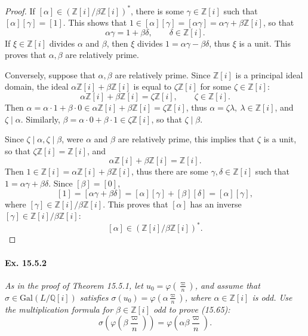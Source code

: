\documentclass[11pt,a4paper]{article}
\newcommand{\Q}{\mathbb{Q}}
\newcommand{\Z}{\mathbb{Z}}
\newcommand{\Gal}{\mathrm{Gal}}
\begin{document}
\begin{proof} 
If $[\alpha] \in \left(\Z[i]/ \beta \Z[i] \right)^*$, there is some $\gamma \in \Z[i]$ such that $[\alpha] [\gamma ] = [1]$. This shows that $1 \in [\alpha] [\gamma] = [\alpha \gamma] = \alpha \gamma+ \beta \Z[i]$, so that
$$\alpha \gamma = 1 + \beta \delta,\qquad \delta \in \Z[i].$$
If $\xi \in \Z[i]$ divides $\alpha$ and $\beta$, then $\xi$ divides $1 = \alpha \gamma - \beta \delta$, thus $\xi$ is a unit. This proves that $\alpha, \beta$ are relatively prime.

\bigskip

Conversely, suppose that $\alpha, \beta$ are relatively prime. Since $\Z[i]$ is a principal ideal domain, the ideal $\alpha \Z[i] + \beta \Z[i]$ is equal to $\zeta \Z[i]$ for some $\zeta \in \Z[i]$:
$$\alpha \Z[i] + \beta \Z[i] = \zeta \Z[i],\qquad \zeta \in \Z[i].$$
Then $\alpha = \alpha\cdot 1 + \beta \cdot 0 \in \alpha \Z[i] + \beta \Z[i] = \zeta \Z[i]$, thus $\alpha = \zeta \lambda,\ \lambda \in \Z[i]$, and $\zeta \mid \alpha$. Similarly, $\beta  = \alpha \cdot 0 + \beta \cdot 1 \in \zeta \Z[i]$, so that $ \zeta \mid \beta $. 

Since $\zeta \mid \alpha, \zeta \mid \beta$, were $\alpha$ and $\beta$ are relatively prime, this implies that $\zeta$ is a unit, so that $\zeta \Z[i] = \Z[i]$, and
$$\alpha \Z[i] + \beta \Z[i] = \Z[i].$$
Then $1 \in \Z[i] = \alpha \Z[i] + \beta \Z[i] $, thus there are some $\gamma, \delta \in \Z[i]$ such that $1 =\alpha \gamma + \beta \delta$. Since $[\beta] = [0]$,
$$[1] = [\alpha \gamma + \beta \delta] = [\alpha][\gamma] + [\beta][\delta] = [\alpha][\gamma],$$
where $[\gamma] \in \Z[i]/\beta \Z[i]$. This proves that $[\alpha]$ has an inverse $[\gamma] \in \Z[i]/\beta \Z[i]$:
$$[\alpha] \in \left(\Z[i]/ \beta \Z[i] \right)^*.$$
\end{proof}

\paragraph{Ex. 15.5.2}{\it As in the proof of Theorem 15.5.1, let $u_0 = \varphi \left(\frac{\varpi}{n} \right)$, and assume that $\sigma \in \Gal\left(L/\Q[i]\right)$ satisfies $\sigma(u_0) = \varphi\left(\alpha 
\frac{\varpi}{n} \right)$, where $\alpha \in \Z[i]$ is odd. Use the multiplication formula for $\beta \in \Z[i]$ odd to prove (15.65):
$$\sigma \left(\varphi\left(\beta \frac{\varpi}{n} \right) \right) = \varphi\left(\alpha \beta \frac{\varpi}{n} \right).$$
}
\end{document}
